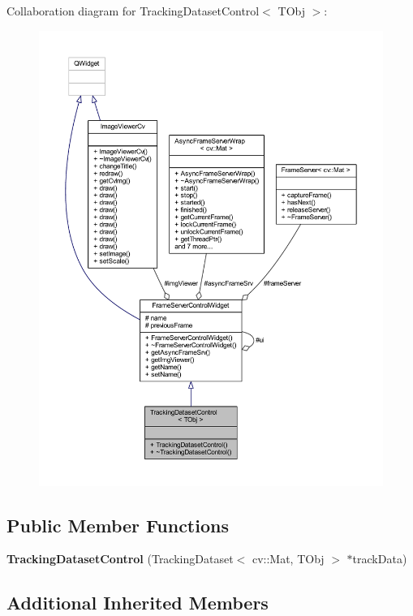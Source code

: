 Collaboration diagram for Tracking\+Dataset\+Control$<$ T\+Obj $>$\+:
\nopagebreak
\begin{figure}[H]
\begin{center}
\leavevmode
\includegraphics[width=350pt]{class_tracking_dataset_control__coll__graph}
\end{center}
\end{figure}
\subsection*{Public Member Functions}
\begin{DoxyCompactItemize}
\item 
\hypertarget{class_tracking_dataset_control_a0bffbe12a4bc8eae3fbe8412e7de0a7c}{}{\bfseries Tracking\+Dataset\+Control} (Tracking\+Dataset$<$ cv\+::\+Mat, T\+Obj $>$ $\ast$track\+Data)\label{class_tracking_dataset_control_a0bffbe12a4bc8eae3fbe8412e7de0a7c}

\end{DoxyCompactItemize}
\subsection*{Additional Inherited Members}


